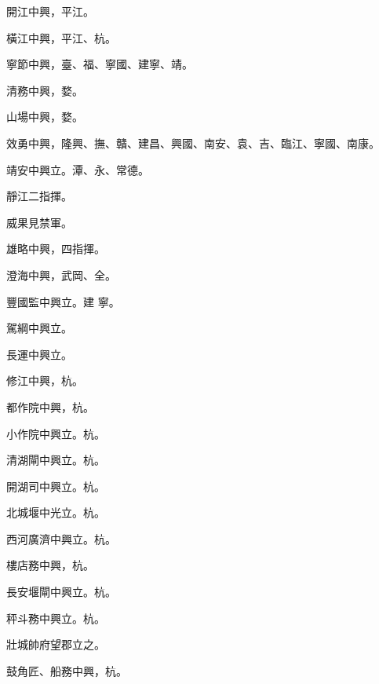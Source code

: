 \begin{pinyinscope}
 開江中興，平江。



 橫江中興，平江、杭。



 寧節中興，臺、福、寧國、建寧、靖。



 清務中興，婺。



 山場中興，婺。



 效勇中興，隆興、撫、贛、建昌、興國、南安、袁、吉、臨江、寧國、南康。



 靖安中興立。潭、永、常德。



 靜江二指揮。



 威果見禁軍。



 雄略中興，四指揮。



 澄海中興，武岡、全。



 豐國監中興立。建
 寧。



 駕綱中興立。



 長運中興立。



 修江中興，杭。



 都作院中興，杭。



 小作院中興立。杭。



 清湖閘中興立。杭。



 開湖司中興立。杭。



 北城堰中光立。杭。



 西河廣濟中興立。杭。



 樓店務中興，杭。



 長安堰閘中興立。杭。



 秤斗務中興立。杭。



 壯城帥府望郡立之。



 鼓角匠、船務中興，杭。



\end{pinyinscope}